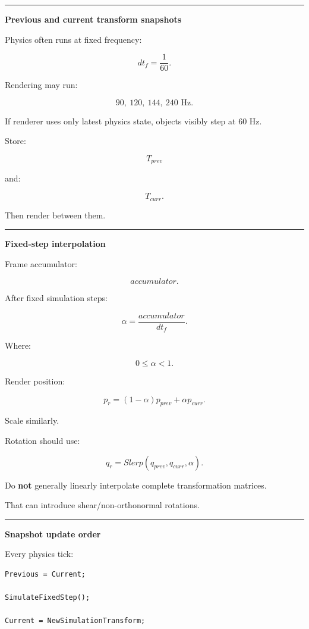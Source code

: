 \begin{center}\rule{0.5\linewidth}{0.5pt}\end{center}

\textbf{Previous and current transform snapshots}

Physics often runs at fixed frequency:

\[
dt_f=\frac1{60}.
\]

Rendering may run:

\[
90,\ 120,\ 144,\ 240\text{ Hz}.
\]

If renderer uses only latest physics state, objects visibly step at 60 Hz.

Store:

\[
T_{prev}
\]

and:

\[
T_{curr}.
\]

Then render between them.

\begin{center}\rule{0.5\linewidth}{0.5pt}\end{center}

\textbf{Fixed-step interpolation}

Frame accumulator:

\[
accumulator.
\]

After fixed simulation steps:

\[
\alpha=
\frac{accumulator}{dt_f}.
\]

Where:

\[
0\le\alpha<1.
\]

Render position:

\[
p_r=
(1-\alpha)p_{prev}
+
\alpha p_{curr}.
\]

Scale similarly.

Rotation should use:

\[
q_r=
Slerp(q_{prev},q_{curr},\alpha).
\]

Do \textbf{not} generally linearly interpolate complete transformation matrices.

That can introduce shear/non-orthonormal rotations.

\begin{center}\rule{0.5\linewidth}{0.5pt}\end{center}

\textbf{Snapshot update order}

Every physics tick:

\begin{verbatim}
Previous = Current;

SimulateFixedStep();

Current = NewSimulationTransform;
\end{verbatim}

